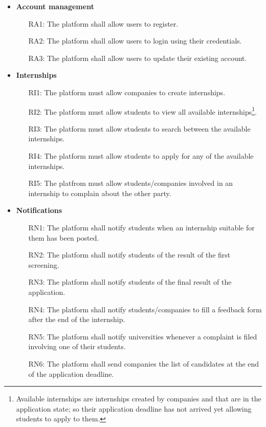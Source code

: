 \documentclass[11pt,twoside]{article}
\begin{document}
\begin{itemize}
\item \textbf{Account management}
\begin{itemize}
\item[RA1:] The platform shall allow users to register.
\item[RA2:] The platform shall allow users to login using their credentials.
\item[RA3:] The platform shall allow users to update their existing account.
\end{itemize}
\item \textbf{Internships}
\begin{itemize}
\item[RI1:] The platform must allow companies to create internships.
\item[RI2:] The platform must allow students to view all available internships\footnote{Available internships are internships created by companies and that are in the application state; so their application deadline has not arrived yet allowing students to apply to them.}.
\item[RI3:] The platform must allow students to search between the available internships.
\item[RI4:] The platform must allow students to apply for any of the available internships.
\item[RI5:] The platfrom must allow students/companies involved in an internship to complain about the other party.
\end{itemize}
\item \textbf{Notifications}
\begin{itemize}
\item[RN1:] The platform shall notify students when an internship suitable for them has been posted.
\item[RN2:] The platform shall notify students of the result of the first screening.
\item[RN3:] The platform shall notify students of the final result of the application.
\item[RN4:] The platform shall notify students/companies to fill a feedback form after the end of the internship.
\item[RN5:] The platform shall notify universities whenever a complaint is filed involving one of their students.
\item[RN6:] The platform shall send companies the list of candidates at the end of the application deadline.
\end{itemize}

\end{itemize}
\end{document}
